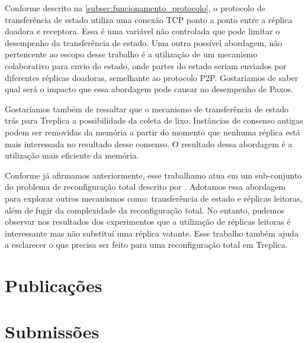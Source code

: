 Conforme descrito na \autoref{subsec:funcionamento_protocolo}, o protocolo de
transferência de estado utiliza uma conexão TCP ponto a ponto entre a réplica doadora e
receptora. Essa é uma variável não controlada que pode limitar o desempenho da
transferência de estado. Uma outra possível abordagem, não pertencente ao escopo desse
trabalho é a utilização de um mecanismo colaborativo para envio do estado, onde partes do
estado seriam enviados por diferentes réplicas doadoras, semelhante ao protocolo P2P.
Gostaríamos de saber qual será o impacto que essa abordagem pode causar no desempenho de
Paxos.

Gostaríamos também de ressaltar que o mecanismo de transferência de estado trás para
Treplica a possibilidade da coleta de lixo. Instâncias de consenso antigas podem ser
removidas da memória a partir do momento que nenhuma réplica está mais interessada no
resultado desse consenso. O resultado dessa abordagem é a utilização mais eficiente da
memória.

Conforme já afirmamos anteriormente, esse trabalhamo atua em um sub-conjunto do problema
de reconfiguração total descrito por \cite{lamport10}. Adotamos essa abordagem para
explorar outros mecanismos como: transferência de estado e réplicas leitoras, além de
fugir da complexidade da reconfiguração total. No entanto, pudemos observar nos resultados
dos experimentos que a utilização de réplicas leitoras é interessante mas não substituí
uma réplica votante. Esse trabalho também ajuda a esclarecer o que precisa ser feito para
uma reconfiguração total em Treplica.

\section*{Publicações}


\section*{Submissões}



